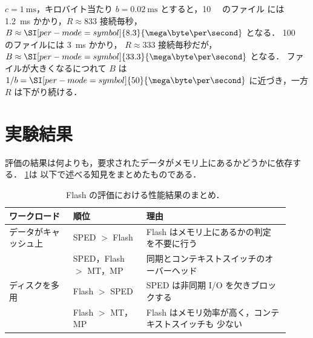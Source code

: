 \documentclass[../main.tex]{subfiles}
\begin{document}
\begin{example}
  $c = \SI{1}{\milli\second}$，キロバイト当たり
  $b = \SI{0.02}{\milli\second}$ とすると，\SI{10}{\kilo\byte} のファイル
  には \SI{1.2}{\milli\second} かかり，$R \approx 833$ 接続毎秒，
  $B \approx \SI[per-mode=symbol]{8.3}{\mega\byte\per\second}$ となる．
  \SI{100}{\kilo\byte} のファイルには \SI{3}{\milli\second} かかり，
  $R \approx 333$ 接続毎秒だが，
  $B \approx \SI[per-mode=symbol]{33.3}{\mega\byte\per\second}$ となる．
  ファイルが大きくなるにつれて $B$ は
  $1/b = \SI[per-mode=symbol]{50}{\mega\byte\per\second}$ に近づき，一方
  $R$ は下がり続ける．
\end{example}

\section{実験結果}
\label{sec:l06-results}

評価の結果は何よりも，要求されたデータがメモリ上にあるかどうかに依存する．
\cref{tab:l06-results}は
以下で述べる知見をまとめたものである．%

\begin{table}[htbp]
  \centering
  \caption{Flash の評価における性能結果のまとめ．}
  \label{tab:l06-results}
  \small
  \begin{tabular}{@{}>{\raggedright\arraybackslash}p{0.21\linewidth}>{\raggedright\arraybackslash}p{0.24\linewidth}>{\raggedright\arraybackslash}p{0.47\linewidth}@{}}
    \toprule
    ワークロード & 順位 & 理由 \\
    \midrule
    データがキャッシュ上 & SPED $>$ Flash & Flash はメモリ上にあるかの判定
      を不要に行う \\
    & SPED，Flash $>$ MT，MP & 同期とコンテキストスイッチのオーバーヘッド \\
    \midrule
    ディスクを多用 & Flash $>$ SPED & SPED は非同期 I/O を欠きブロックする \\
    & Flash $>$ MT，MP & Flash はメモリ効率が高く，コンテキストスイッチも
      少ない \\
    \bottomrule
  \end{tabular}
\end{table}
\end{document}
